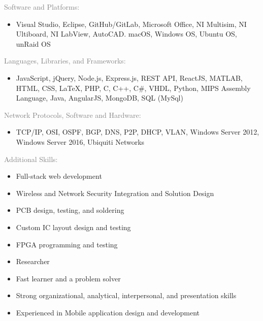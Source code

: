 \documentclass[letterpage]{article}
\begin{document}
\begin{minipage}[t]{0.424\linewidth}
\begin{minipage}[]{0.85\linewidth}
\raggedright
\textcolor{gray}{Software and Platforms:}
\begin{itemize}[label={},leftmargin=*,labelindent=5mm]
\item
Visual Studio,
Eclipse,
GitHub/GitLab,
Microsoft Office,
NI Multisim,
NI Ultiboard,
NI LabView,
AutoCAD.
macOS,
Windows OS,
Ubuntu OS,
unRaid OS
\end{itemize}
\vspace{7px}
\textcolor{gray}{Languages, Libraries, and Frameworks:}\\
\begin{itemize}[label={},leftmargin=*,labelindent=5mm]
\item
JavaScript,
jQuery,
Node.js,
Express.js,
REST API,
ReactJS,
MATLAB,
HTML,
CSS,
LaTeX,
PHP,
C,
C++,
C\#,
VHDL,
Python,
MIPS Assembly Language,
Java,
AngularJS,
MongoDB,
SQL (MySql)
\end{itemize}
\vspace{7px}
\textcolor{gray}{Network Protocols, Software and Hardware:}\\
\begin{itemize}[label={},leftmargin=*,labelindent=5mm]
\item
TCP/IP,
OSI, 
OSPF,
BGP,
DNS,
P2P,
DHCP,
VLAN,
Windows Server 2012,
Windows Server 2016,
Ubiquiti Networks
\end{itemize}
\vspace{7px}
\textcolor{gray}{Additional Skills:}
\begin{itemize}[leftmargin=*,labelindent=5mm,labelsep=7mm]
\renewcommand\labelitemi{\rule[1mm]{0.33mm}{0.33mm}}
\renewcommand\labelitemii{$\blacksquare$} 
\item
  Full-stack web development
\item
  Wireless and Network Security Integration and Solution Design
\item
  PCB design, testing, and soldering
\item
  Custom IC layout design and testing
  \begin{comment}(starting from
  transistor level)\end{comment}
\item
  FPGA programming and testing
\item
  Researcher
\item
  Fast learner and a problem solver
\item
  Strong organizational, analytical, interpersonal,
  and presentation skills
\item
  Experienced in Mobile application design and development
\end{itemize}
\end{minipage}
\end{minipage}
\end{document}
